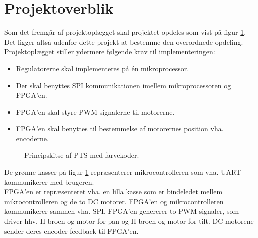 \section{Projektoverblik}
\label{sec:projektoverblik}
Som det fremgår af projektoplægget skal projektet opdeles som vist på 
figur \ref{fig:overview_openloop_PTS}. 
Det ligger altså udenfor dette projekt at bestemme den overordnede opdeling.
Projektoplægget stiller ydermere følgende krav til implementeringen:
\begin{itemize}
\itemsep1pt
  \item Regulatorerne skal implementeres på én mikroprocessor.
  \item Der skal benyttes SPI kommunikationen imellem mikroprocessoren og FPGA’en.
  \item FPGA’en skal styre PWM-signalerne til motorerne.
  \item FPGA’en skal benyttes til bestemmelse af motorernes position vha. encoderne.
\end{itemize}

\bigskip

\begin{figure}[!th]
\centering
\begin{tikzpicture}[auto, node distance=1cm,>=latex']

\end{tikzpicture}
\caption[Principskitse af PTS]{Principskitse af PTS med farvekoder.}
\label{fig:overview_openloop_PTS}
\end{figure}
De grønne kasser på figur \ref{fig:overview_openloop_PTS}
repræsenterer mikrocontrolleren som vha. UART kommunikerer med brugeren. \\
FPGA'en er repræsenteret vha. en lilla kasse som er bindeledet mellem mikrocontrolleren og de to DC motorer. 
FPGA'en og mikrocontrolleren kommunikerer sammen vha. SPI.
FPGA'en genererer to PWM-signaler, som driver hhv. H-broen og motor for
pan og H-broen og motor for tilt. DC motorene sender deres encoder feedback til FPGA'en.